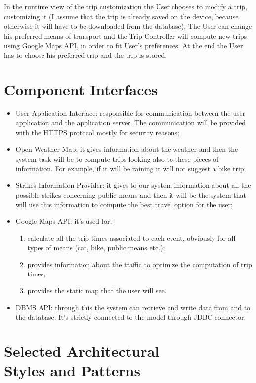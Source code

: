 In the runtime view of the trip customization the User chooses to modify a trip, customizing it (I assume that the trip is already saved on the device, because otherwise it will have to be downloaded from the database). The User can change his preferred means of transport and the Trip Controller will compute new trips using Google Maps API, in order to fit User's preferences. At the end the User has to choose his preferred trip and the trip is stored.

%
%
\section{Component Interfaces}
\begin{itemize}
\item	User Application Interface: responsible for communication between the user application and the application server. The communication will be provided with the HTTPS protocol mostly for security reasons;
\item	Open Weather Map: it gives information about the weather and then the system task will be to compute trips looking also to these pieces of information. For example, if it will be raining it will not suggest a bike trip;
\item	Strikes Information Provider: it gives to our system information about all the possible strikes concerning public means and then it will be the system that will use this information to compute the best travel option for the user;
\item	Google Maps API: it’s used for:
\begin{enumerate}
\item	calculate all the trip times associated to each event, obviously for all types of means (car, bike, public means etc.);
\item	provides information about the traffic to optimize the computation of trip times;
\item	provides the static map that the user will see.
\end{enumerate}
\item	DBMS API: through this the system can retrieve and write data from and to the database. It’s strictly connected to the model through JDBC connector.
\end{itemize}
%
%
\section{Selected Architectural \\Styles and Patterns}

